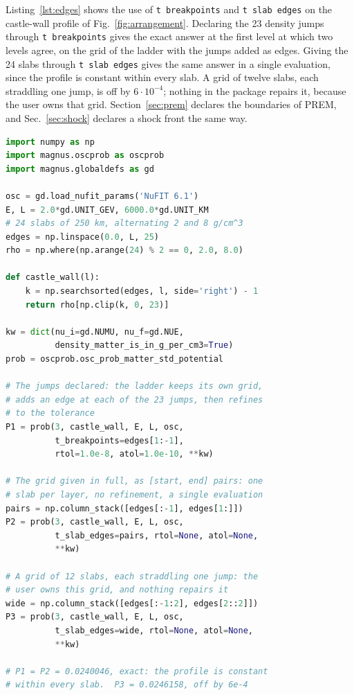 \documentclass[final,5p,times,twocolumn,sort,compress]{elsarticle}
\makeatletter
\newcommand{\fig}{Fig.}
\DeclareRobustCommand{\_}{%
  \ifmmode\nfss@text{\textunderscore}\else\textunderscore\allowbreak\fi}
\newcommand{\figu}[1]{\fig~\ref{fig:#1}}
\makeatother
\begin{document}
Listing~\ref{lst:edges} shows the use of {\tt t\_breakpoints} and {\tt t\_slab\_edges} on the castle-wall profile of \figu{arrangement}. Declaring the 23 density jumps through {\tt t\_breakpoints} gives the exact answer at the first level at which two levels agree, on the grid of the ladder with the jumps added as edges. Giving the 24 slabs through {\tt t\_slab\_edges} gives the same answer in a single evaluation, since the profile is constant within every slab. A grid of twelve slabs, each straddling one jump, is off by $6 \cdot 10^{-4}$; nothing in the package repairs it, because the user owns that grid. Section~\ref{sec:prem} declares the boundaries of PREM, and Sec.~\ref{sec:shock} declares a shock front the same way.

\begin{lstlisting}[language=Python, caption={\textbf{Placing slab edges by hand.} The two ways of placing slab edges by hand, on the castle-wall profile of \figu{arrangement}. {\tt t\_breakpoints} adds the positions of the jumps to the grid of the refinement ladder, which then refines as usual. {\tt t\_slab\_edges} replaces the grid with the given {[}start, end{]} pairs, which stay fixed. The first two calls return the exact result, because the profile is constant within every slab. The third call passes a grid whose slabs straddle the jumps: its result is off by $6 \cdot 10^{-4}$, and nothing corrects it, because the grid is the user's. Section~\ref{sec:shock} declares the two fronts of a supernova shock through {\tt t\_breakpoints} in the same way.}, label={lst:edges}, float=tbp]
import numpy as np
import magnus.oscprob as oscprob
import magnus.globaldefs as gd

osc = gd.load_nufit_params('NuFIT 6.1')
E, L = 2.0*gd.UNIT_GEV, 6000.0*gd.UNIT_KM
# 24 slabs of 250 km, alternating 2 and 8 g/cm^3
edges = np.linspace(0.0, L, 25)
rho = np.where(np.arange(24) % 2 == 0, 2.0, 8.0)

def castle_wall(l):
    k = np.searchsorted(edges, l, side='right') - 1
    return rho[np.clip(k, 0, 23)]

kw = dict(nu_i=gd.NUMU, nu_f=gd.NUE,
          density_matter_is_in_g_per_cm3=True)
prob = oscprob.osc_prob_matter_std_potential

# The jumps declared: the ladder keeps its own grid,
# adds an edge at each of the 23 jumps, then refines
# to the tolerance
P1 = prob(3, castle_wall, E, L, osc,
          t_breakpoints=edges[1:-1],
          rtol=1.0e-8, atol=1.0e-10, **kw)

# The grid given in full, as [start, end] pairs: one
# slab per layer, no refinement, a single evaluation
pairs = np.column_stack([edges[:-1], edges[1:]])
P2 = prob(3, castle_wall, E, L, osc,
          t_slab_edges=pairs, rtol=None, atol=None,
          **kw)

# A grid of 12 slabs, each straddling one jump: the
# user owns this grid, and nothing repairs it
wide = np.column_stack([edges[:-1:2], edges[2::2]])
P3 = prob(3, castle_wall, E, L, osc,
          t_slab_edges=wide, rtol=None, atol=None,
          **kw)

# P1 = P2 = 0.0240046, exact: the profile is constant
# within every slab.  P3 = 0.0246158, off by 6e-4
\end{lstlisting}
\end{document}
